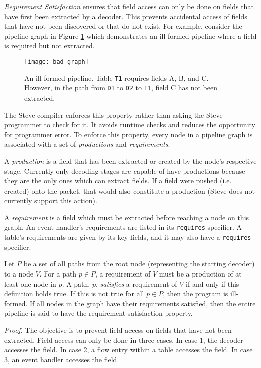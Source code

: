 \textit{Requirement Satisfaction} ensures that field access can only be done on fields that have first been extracted by a decoder. This prevents accidental access of fields that have not been discovered or that do not exist. For example, consider the pipeline graph in Figure \ref{fig:bad_graph} which demonstrates an ill-formed pipeline where a field is required but not extracted.

\begin{figure}[ht]
\texttt{[image: bad\_graph]}
\caption{An ill-formed pipeline. Table \texttt{T1} requires fields A, B, and C. However, in the path from \texttt{D1} to \texttt{D2} to \texttt{T1}, field C has not been extracted.}
\label{fig:bad_graph}
\end{figure}

The Steve compiler enforces this
property rather than asking the Steve programmer to check for it.
It avoids runtime checks and reduces the opportunity for programmer error.
To enforce this property, 
every node in a pipeline graph is associated with a set of \textit{productions} and \textit{requirements}.

A \textit{production} is a field that has been extracted or created by the node's respective stage. Currently only decoding stages are capable of have productions because they are the only ones which can extract fields. If a field were pushed (i.e. created) onto the packet, that would also constitute a production (Steve does not currently support this action).

A \emph{requirement} is a field which must be extracted before reaching a node on
this graph. An event handler's requirements are listed in its
\texttt{requires} specifier. A table's requirements are given by its
key fields, and it may also have a \texttt{requires} specifier.

Let $P$ be a set of all paths from the root node (representing the starting decoder) to a node $V$.
For a path $p \in P$, a requirement of $V$ must be a production of at least one node in
$p$. A path, $p$, \emph{satisfies} a requirement of $V$ if and only if this
definition holds true. If this is not true for all $p \in P$, then the program
is ill-formed. If all nodes in the graph have their requirements
satisfied, then the entire pipeline is said to have the requirement
satisfaction property.

\textit{Proof.} 
The objective is to prevent field access on fields that have not been extracted. Field access can only be done in three cases. In case 1, the decoder accesses the field.
In case 2, a flow entry within a table accesses the field. In case 3, an event
handler accesses the field.

